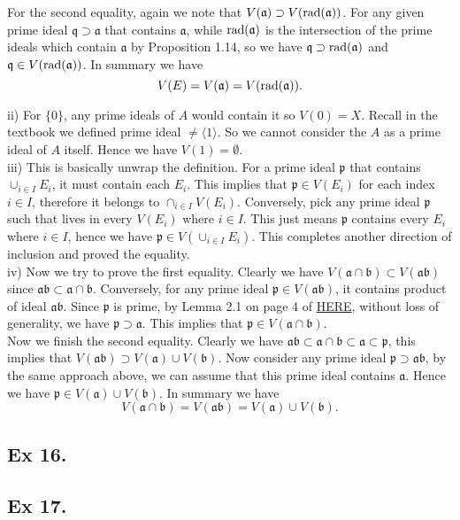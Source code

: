 \noindent For the second equality, again we note that $V(\mathfrak a)\supset V(\operatorname{rad}(\mathfrak a))$. For any given prime ideal $\mathfrak q\supset \mathfrak a$ that contains $\mathfrak a$, while $\operatorname{rad}(\mathfrak a)$ is the intersection of the prime ideals which contain $\mathfrak a$ by Proposition 1.14, so we have $\mathfrak q\supset \operatorname{rad}(\mathfrak a)$ and $\mathfrak q\in V(\operatorname{rad}(\mathfrak a))$. In summary we have 
$$V(E)=V(\mathfrak a)=V(\operatorname{rad}(\mathfrak a)).$$

\noindent ii) For $\{0\}$, any prime ideals of $A$ would contain it so $V(0)=X$. Recall in the textbook we defined prime ideal $\neq \langle 1\rangle$. So we cannot consider the $A$ as a prime ideal of $A$ itself. Hence we have $V(1)=\emptyset$.\\

\noindent iii) This is basically unwrap the definition. For a prime ideal $\mathfrak p$ that contains $\cup_{i\in I} E_i$, it must contain each $E_i$. This implies that $\mathfrak p\in V(E_i)$ for each index $i\in I$, therefore it belongs to $\cap _{i\in I} V(E_i)$. Conversely, pick any prime ideal $\mathfrak p$ such that lives in every $V(E_i)$ where $i\in I$. This just means $\mathfrak p$ contains every $E_i$ where $i\in I$, hence we have $\mathfrak p\in V(\cup_{i\in I} E_i)$. This completes another direction of inclusion and proved the equality.\\

\noindent iv) Now we try to prove the first equality. Clearly we have $V(\mathfrak a \cap \mathfrak b)\subset V(\mathfrak a\mathfrak b)$ since $\mathfrak a\mathfrak b\subset \mathfrak a\cap \mathfrak b$. Conversely, for any prime ideal $\mathfrak p\in V(\mathfrak a\mathfrak b)$, it contains product of ideal $\mathfrak a\mathfrak b$. Since $\mathfrak p$ is prime, by Lemma 2.1 on page 4 of \href{https://www.jmilne.org/math/xnotes/CA.pdf}{HERE}, without loss of generality, we have $\mathfrak p\supset \mathfrak a$. This implies that $\mathfrak p\in V(\mathfrak a\cap\mathfrak b)$.\\

\noindent Now we finish the second equality. Clearly we have $\mathfrak a\mathfrak b\subset \mathfrak a\cap \mathfrak b\subset \mathfrak a\subset \mathfrak p$, this implies that $V(\mathfrak{ab})\supset V(\mathfrak a)\cup V(\mathfrak b)$. Now consider any prime ideal $\mathfrak p\supset \mathfrak {ab}$, by the same approach above, we can assume that this prime ideal contains $\mathfrak a$. Hence we have $\mathfrak p\in V(\mathfrak a)\cup V(\mathfrak b)$.
In summary we have $$V(\mathfrak a\cap \mathfrak b)=V(\mathfrak{ab})=V(\mathfrak a)\cup V(\mathfrak b).$$

\subsection{Ex 16.}

\subsection{Ex 17.}

